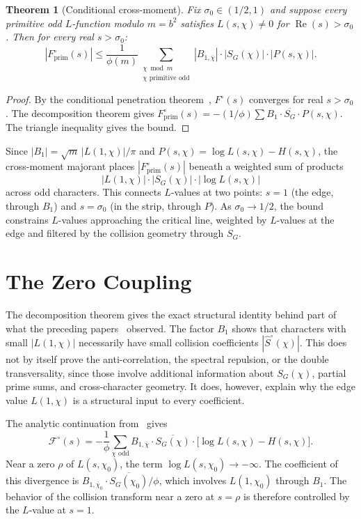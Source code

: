\documentclass[12pt]{amsart}
\newtheorem{theorem}{Theorem}
\theoremstyle{definition}
\theoremstyle{remark}
\begin{document}
\begin{theorem}[Conditional cross-moment]
\label{thm:cross}
Fix $\sigma_0 \in (1/2, 1)$ and suppose every primitive
odd $L$-function modulo $m=b^2$ satisfies
$L(s, \chi) \ne 0$ for
$\operatorname{Re}(s) > \sigma_0$.
Then for every real $s > \sigma_0$:
\[
\left|F^{\circ}_{\mathrm{prim}}(s)\right|
\le
\frac{1}{\phi(m)}
\sum_{\substack{\chi \bmod m \\
\chi \text{ primitive odd}}}
|B_{1,\overline{\chi}}| \cdot |S_G(\chi)|
\cdot |P(s, \chi)|.
\]
\end{theorem}

\begin{proof}
By the conditional penetration
theorem~\cite{paperB}, $F^{\circ}(s)$ converges for
real $s > \sigma_0$. The decomposition theorem gives
$F^{\circ}_{\mathrm{prim}}(s) = -(1/\phi) \sum B_1 \cdot
\overline{S_G} \cdot P(s, \chi)$. The triangle
inequality gives the bound.
\end{proof}

Since $|B_1| = \sqrt{m}\, |L(1, \chi)| / \pi$ and
$P(s, \chi) = \log L(s, \chi) - H(s, \chi)$, the
cross-moment majorant places $|F^{\circ}_{\mathrm{prim}}(s)|$
beneath a weighted sum of products
\[
|L(1, \chi)| \cdot |S_G(\chi)| \cdot
|\log L(s, \chi)|
\]
across odd characters. This connects $L$-values at
two points: $s = 1$ (the edge, through $B_1$) and
$s = \sigma_0$ (in the strip, through $P$). As
$\sigma_0 \to 1/2$, the bound constrains
$L$-values approaching the critical line, weighted
by $L$-values at the edge and filtered by the
collision geometry through $S_G$.

\section{The Zero Coupling}

The decomposition theorem gives the exact structural
identity behind part of what the preceding
papers~\cite{paper19,paper20} observed. The factor
$B_1$ shows that characters with small $|L(1,\chi)|$
necessarily have small collision coefficients
$|\hat{S}^{\circ}(\chi)|$. This does not by itself
prove the anti-correlation, the spectral repulsion,
or the double transversality, since those involve
additional information about $S_G(\chi)$, partial
prime sums, and cross-character geometry. It does,
however, explain why the edge value $L(1,\chi)$ is a
structural input to every coefficient.

The analytic continuation
from~\cite{paperB} gives
\[
\mathcal{F}^{\circ}(s)
= -\frac{1}{\phi} \sum_{\chi \text{ odd}}
B_{1,\overline{\chi}} \cdot \overline{S_G(\chi)}
\cdot \bigl[\log L(s, \chi) - H(s, \chi)\bigr].
\]
Near a zero $\rho$ of $L(s, \chi_0)$, the term
$\log L(s, \chi_0) \to -\infty$. The coefficient
of this divergence is
$B_{1,\overline{\chi}_0} \cdot
\overline{S_G(\chi_0)} / \phi$, which involves
$L(1, \chi_0)$ through $B_1$. The behavior of the
collision transform near a zero at $s = \rho$ is
therefore controlled by the $L$-value at $s = 1$.
\end{document}
